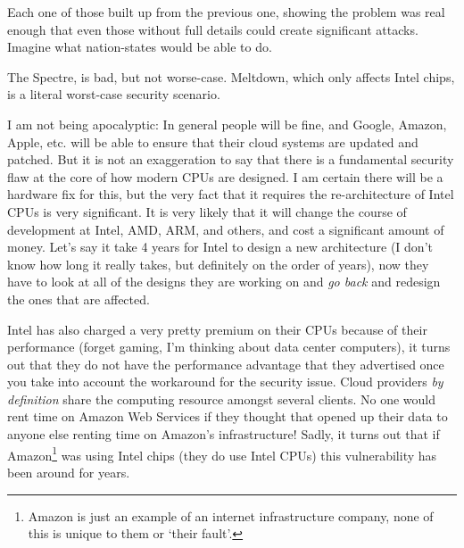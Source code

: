 \documentclass{article}
\begin{document}
Each one of those built up from the previous one, showing the problem was real
enough that even those without full details could create significant attacks.
Imagine what nation-states would be able to do.

The Spectre, is bad, but not worse-case. Meltdown, which only affects Intel
chips, is a literal worst-case security scenario.

I am not being apocalyptic: In general people will be fine, and Google, Amazon,
Apple, etc. will be able to ensure that their cloud systems are updated and
patched. But it is not an exaggeration to say that there is a fundamental
security flaw at the core of how modern CPUs are designed. I am certain there
will be a hardware fix for this, but the very fact that it requires the
re-architecture of Intel CPUs is very significant. It is very likely that it
will change the course of development at Intel, AMD, ARM, and others, and cost
a significant amount of money. Let's say it take 4 years for Intel to design a
new architecture (I don't know how long it really takes, but definitely on the
order of years), now they have to look at all of the designs they are working
on and \emph{go back} and redesign the ones that are affected.

Intel has also charged a very pretty premium on their CPUs because of their
performance (forget gaming, I'm thinking about data center computers), it turns
out that they do not have the performance advantage that they advertised once
you take into account the workaround for the security issue. Cloud providers
\emph{by definition} share the computing resource amongst several clients. No
one would rent time on Amazon Web Services if they thought that opened up their
data to anyone else renting time on Amazon's infrastructure! Sadly, it turns
out that if Amazon\footnote{Amazon is just an example of an internet
infrastructure company, none of this is unique to them or `their fault'.} was
using Intel chips (they do use Intel CPUs) this vulnerability has been around
for years.
\end{document}
